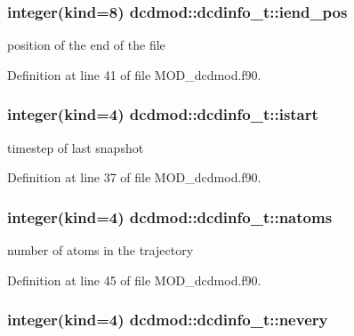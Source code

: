 \hypertarget{structdcdmod_1_1dcdinfo__t_a7418326b53ddd20d067949c817b3b03d}{
\subsubsection[{iend\-\_\-pos}]{\setlength{\rightskip}{0pt plus 5cm}integer(kind=8) dcdmod\-::dcdinfo\-\_\-t\-::iend\-\_\-pos}}\label{structdcdmod_1_1dcdinfo__t_a7418326b53ddd20d067949c817b3b03d}


position of the end of the file 



Definition at line 41 of file M\-O\-D\-\_\-dcdmod.\-f90.

\hypertarget{structdcdmod_1_1dcdinfo__t_a6f7b40c99890fd6bfc38a9dde608bec2}{
\subsubsection[{istart}]{\setlength{\rightskip}{0pt plus 5cm}integer(kind=4) dcdmod\-::dcdinfo\-\_\-t\-::istart}}\label{structdcdmod_1_1dcdinfo__t_a6f7b40c99890fd6bfc38a9dde608bec2}


timestep of last snapshot 



Definition at line 37 of file M\-O\-D\-\_\-dcdmod.\-f90.

\hypertarget{structdcdmod_1_1dcdinfo__t_a49fecacd96f7fad5558ee7f16a81b4d8}{
\subsubsection[{natoms}]{\setlength{\rightskip}{0pt plus 5cm}integer(kind=4) dcdmod\-::dcdinfo\-\_\-t\-::natoms}}\label{structdcdmod_1_1dcdinfo__t_a49fecacd96f7fad5558ee7f16a81b4d8}


number of atoms in the trajectory 



Definition at line 45 of file M\-O\-D\-\_\-dcdmod.\-f90.

\hypertarget{structdcdmod_1_1dcdinfo__t_a6637e3bbb65e0d530e2893bec42a78c1}{
\subsubsection[{nevery}]{\setlength{\rightskip}{0pt plus 5cm}integer(kind=4) dcdmod\-::dcdinfo\-\_\-t\-::nevery}}\label{structdcdmod_1_1dcdinfo__t_a6637e3bbb65e0d530e2893bec42a78c1}


